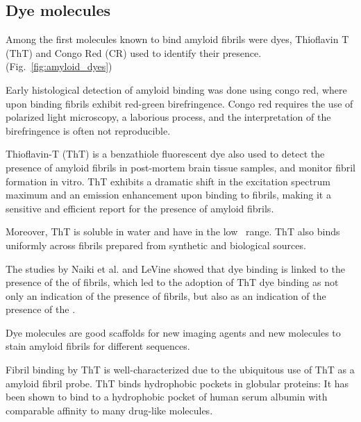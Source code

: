 \subsection{Dye molecules}
Among the first molecules known to bind amyloid fibrils were dyes, Thioflavin T (ThT) and Congo Red (CR) used to identify their presence.(Fig.~\ref{fig:amyloid_dyes})

Early histological detection of amyloid binding was done using congo red, where upon binding fibrils exhibit red-green birefringence. Congo red requires the use of polarized light microscopy, a laborious process, and the interpretation of the birefringence is often not reproducible.

Thioflavin-T (ThT) is a benzathiole fluorescent dye also used to detect the presence of amyloid fibrils in post-mortem brain tissue samples, and monitor fibril formation in vitro. ThT exhibits a dramatic shift in the excitation spectrum maximum and an emission enhancement upon binding to fibrils, making it a sensitive and efficient report for the presence of amyloid fibrils.

Moreover, ThT is soluble in water and have \KD in the low \micromolar\ range.  ThT also binds uniformly across fibrils prepared from synthetic and biological sources.

The studies by Naiki et al. and LeVine showed that dye binding is linked to the presence of the \crossbs of fibrils, which led to the adoption of ThT dye binding as not only an indication of the presence of fibrils, but also as an indication of the presence of the \crossbs.

Dye molecules are good scaffolds for new imaging agents and new molecules to stain amyloid fibrils for different sequences.

Fibril binding by ThT is well-characterized due to the ubiquitous use of ThT as a amyloid fibril probe.
ThT binds hydrophobic pockets in globular proteins: It has been shown to bind to a hydrophobic pocket of human serum albumin with comparable affinity to many drug-like molecules.\cite{Groenning:2007p3436,Groenning:2007eo}



